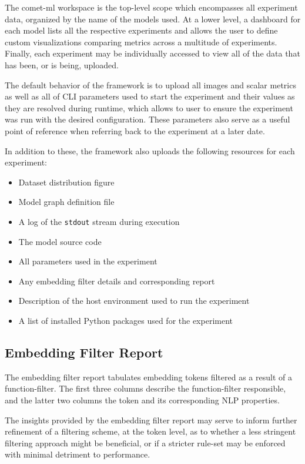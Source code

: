 \documentclass[../../fyp.tex]{subfiles}
\begin{document}
 \label{sec:comet_ml_integration}
The comet-ml workspace is the top-level scope which encompasses all experiment data, organized by the name of the models used. At a lower level, a dashboard for each model lists all the respective experiments and allows the user to define custom visualizations comparing metrics across a multitude of experiments. Finally, each experiment may be individually accessed to view all of the data that has been, or is being, uploaded.

The default behavior of the framework is to upload all images and scalar metrics as well as all of CLI parameters used to start the experiment and their values as they are resolved during runtime, which allows to user to ensure the experiment was run with the desired configuration. These parameters also serve as a useful point of reference when referring back to the experiment at a later date. 

In addition to these, the framework also uploads the following resources for each experiment:
\begin{itemize}
\item Dataset distribution figure
\item Model graph definition file
\item A log of the \texttt{stdout} stream during execution
\item The model source code
\item All parameters used in the experiment
\item Any embedding filter details and corresponding report
\item Description of the host environment used to run the experiment 
\item A list of installed Python packages used for the experiment
\end{itemize}

\subsection{Embedding Filter Report}
The embedding filter report tabulates embedding tokens filtered as a result of a function-filter. The first three columns describe the function-filter responsible, and the latter two columns the token and its corresponding NLP properties. 

The insights provided by the embedding filter report may serve to inform further refinement of a filtering scheme, at the token level, as to whether a less stringent filtering approach might be beneficial, or if a stricter rule-set may be enforced with minimal detriment to performance. 
\end{document}
